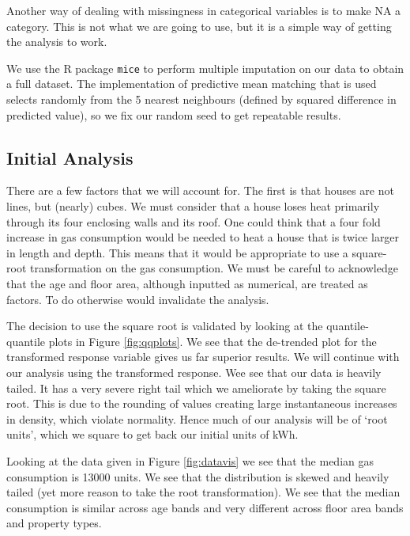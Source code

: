 \documentclass[9pt]{extarticle}
\begin{document}
Another way of dealing with missingness in categorical variables is to make NA a category. This is not what we are going to use, but it is a simple way of getting the analysis to work.

We use the R package \texttt{mice} to perform multiple imputation on our data to obtain a full dataset. The implementation of predictive mean matching that is used selects randomly from the 5 nearest neighbours (defined by squared difference in predicted value), so we fix our random seed to get repeatable results.

\subsection{Initial Analysis}

There are a few factors that we will account for. The first is that houses are not lines, but (nearly) cubes. We must consider that a house loses heat primarily through its four enclosing walls and its roof. One could think that a four fold increase in gas consumption would be needed to heat a house that is twice larger in length and depth. This means that it would be appropriate to use a square-root transformation on the gas consumption. We must be careful to acknowledge that the age and floor area, although inputted as numerical, are treated as factors. To do otherwise would invalidate the analysis.

The decision to use the square root is validated by looking at the quantile-quantile plots in Figure \ref{fig:qqplots}. We see that the de-trended plot for the transformed response variable gives us far superior results. We will continue with our analysis using the transformed response. Wee see that our data is heavily tailed. It has a very severe right tail which we ameliorate by taking the square root. This is due to the rounding of values creating large instantaneous increases in density, which violate normality. Hence much of our analysis will be of `root units', which we square to get back our initial units of kWh.

Looking at the data given in Figure \ref{fig:datavis} we see that the median gas consumption is 13000 units. We see that the distribution is skewed and heavily tailed (yet more reason to take the root transformation). We see that the median consumption is similar across age bands and very different across floor area bands and property types.
\end{document}
